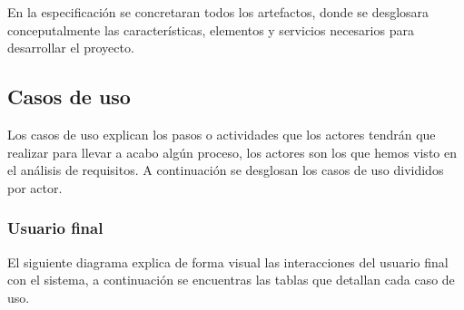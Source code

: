 \newcommand\addrow[2]{#1 &#2\\ }

\newcommand\addheading[2]{#1 &#2\\ \hline}
\newcommand\tabularhead{\begin{tabular}{lp{11cm}}
\hline
}
\newcommand\addmulrow[2]{ \begin{minipage}[t][][t]{2.5cm}#1\end{minipage}%
   &\begin{minipage}[t][][t]{11cm}
    \begin{enumerate} #2   \end{enumerate}
    \end{minipage}\\ }

\newenvironment{usecase}{\tabularhead}
{\hline\end{tabular}}

\iffalse
\begin{usecase}
  \addheading{Actor}{System user} 
  \addrow{Precondición}{The system, shows, in the form part of an object type, the number   indication.}
  \addrow{Postcondición}{A disconnected number indicating the type of `other constructed object'.}
  \addmulrow{Escenario principal}{\item User selects \ldots
                                   \item System demands \ldots}
\end{usecase}
\fi


En la especificación se concretaran todos los artefactos, donde se desglosara conceputalmente las características, elementos y servicios necesarios para desarrollar el proyecto.

\subsection{Casos de uso}
Los casos de uso explican los pasos o actividades que los actores tendrán que realizar para llevar a acabo algún proceso, los actores son los que hemos visto en el análisis de requisitos. A continuación se desglosan los casos de uso divididos por actor.

\subsubsection{Usuario final}
El siguiente diagrama explica de forma visual las interacciones del usuario final con el sistema, a continuación se encuentras las tablas que detallan cada caso de uso.


